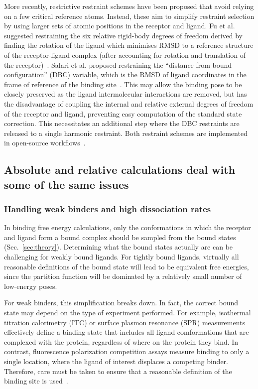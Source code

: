 \documentclass[9pt,bestpractices]{livecoms}
\begin{document}
More recently, restrictive restraint schemes have been proposed that avoid relying on a few critical reference atoms. Instead, these aim to simplify restraint selection by using larger sets of atomic positions in the receptor and ligand. Fu et al. suggested restraining the six relative rigid-body degrees of freedom derived by finding the rotation of the ligand which minimises RMSD to a reference structure of the receptor-ligand complex (after accounting for rotation and translation of the receptor)~\cite{fu2017new}. Salari et al. proposed restraining the ``distance-from-bound-configuration'' (DBC) variable, which is the RMSD of ligand coordinates in the frame of reference of the binding site~\cite{salari2018streamlined, ebrahimi2022symmetry}. This may allow the binding pose to be closely preserved as the ligand intermolecular interactions are removed, but has the disadvantage of coupling the internal and relative external degrees of freedom of the receptor and ligand, preventing easy computation of the standard state correction. This necessitates an additional step where the DBC restraints are released to a single harmonic restraint. Both restraint schemes are implemented in open-source workflows~\cite{fu2021bfee2, fu2022accurate, santiago-mcrae2023computing}.

\subsection{Absolute and relative calculations deal with some of the same issues}
\subsubsection{Handling weak binders and high dissociation rates}\label{sec:weak-binders}
In binding free energy calculations, only the conformations in which the receptor and ligand form a bound complex should be sampled from the bound states (Sec.~\ref{sec:theory}). Determining what the bound states actually are can be challenging for weakly bound ligands. For tightly bound ligands, virtually all reasonable definitions of the bound state will lead to be equivalent free energies, since the partition function will be dominated by a relatively small number of low-energy poses. 

For weak binders, this simplification breaks down.  In fact, the correct bound state may depend on the type of experiment performed.  For example, isothermal titration calorimetry (ITC) or surface plasmon resonance (SPR) measurements effectively define a binding state that includes all ligand comformations that are complexed with the protein, regardless of where on the protein they bind. In contrast, fluorescence polarization competition assays measure binding to only a single location, where the ligand of interest displaces a competing binder. Therefore, care must be taken to ensure that a reasonable definition of the binding site is used~\cite{wang2013identifying}.
\end{document}
